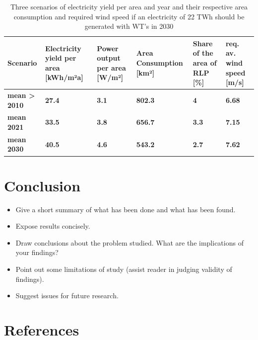\documentclass[a4paper,11pt]{article}
\begin{document}
\begin{table}[H]

\caption{\label{tab:table2}Three scenarios of electricity yield per area and year and their respective area consumption 
  and required wind speed if an electricity of 22 TWh should be generated with WT's in 2030}
\centering
\begin{tabular}[t]{>{\raggedright\arraybackslash}p{2.2cm}>{\raggedright\arraybackslash}p{2.2cm}>{\raggedright\arraybackslash}p{2.2cm}>{\raggedright\arraybackslash}p{2.2cm}>{\raggedright\arraybackslash}p{2.2cm}>{\raggedright\arraybackslash}p{2.2cm}}
\toprule
Scenario & Electricity yield per area [kWh/m²a] & Power output per area [W/m²] & Area Consumption [km²] & Share of the area of RLP [\%] & req. av. wind speed [m/s]\\
\midrule
\textbf{mean > 2010} & \textbf{27.4} & \textbf{3.1} & \textbf{802.3} & \textbf{4} & \textbf{6.68}\\
\midrule
\textbf{mean 2021} & \textbf{33.5} & \textbf{3.8} & \textbf{656.7} & \textbf{3.3} & \textbf{7.15}\\
\midrule
\textbf{mean 2030} & \textbf{40.5} & \textbf{4.6} & \textbf{543.2} & \textbf{2.7} & \textbf{7.62}\\
\midrule
\bottomrule
\end{tabular}
\end{table}
\hypertarget{conclusion}{%
\section{Conclusion}\label{conclusion}}
\begin{itemize}
\item
  Give a short summary of what has been done and what has been found.
\item
  Expose results concisely.
\item
  Draw conclusions about the problem studied. What are the implications of your
  findings?
\item
  Point out some limitations of study (assist reader in judging validity of
  findings).
\item
  Suggest issues for future research.
\end{itemize}
\newpage

\hypertarget{references}{%
\section*{References}\label{references}}
\end{document}
